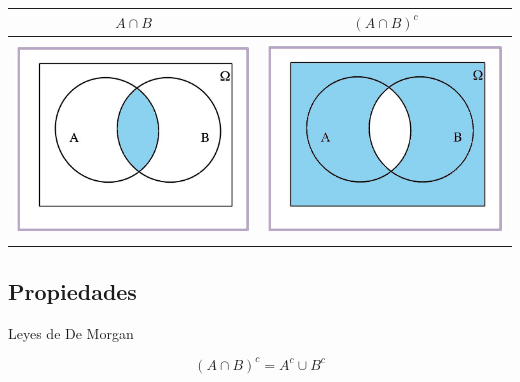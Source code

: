 \documentclass[]{book}
\begin{document}
\begin{longtable}[]{@{}cc@{}}
\toprule
\(A\cap B\) & \((A\cap B)^c\)\tabularnewline
\midrule
\endhead
\includegraphics[width=\textwidth,height=2.08333in]{Images/proba1dibujos/demorgan1.jpg} & \includegraphics[width=\textwidth,height=2.08333in]{Images/proba1dibujos/demorgan2.jpg}\tabularnewline
\bottomrule
\end{longtable}

\hypertarget{propiedades-7}{%
\subsection{Propiedades}\label{propiedades-7}}

Leyes de De Morgan

\[(A\cap B)^c=A^c\cup B^c\]
\end{document}
